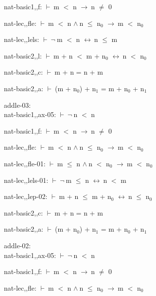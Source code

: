 \documentclass[a4paper]{article}
\newcommand{\Fol}{\mbox{$\vdash\ $}}
\newcommand{\Not}{\mbox{$\neg\ $}}
\newcommand{\And}{\mbox{$\wedge\ $}}
\newcommand{\Imp}{\mbox{$\rightarrow\ $}}
\newcommand{\Equiv}{\mbox{$\leftrightarrow\ $}}
\begin{document}
nat-basic1,,f: 
 \Fol m $<$ n \Imp n $\neq$ 0



nat-lec,,fle: 
 \Fol m $<$ n \And n $\le$ $\mbox{n}_{0}$ \Imp m $<$ $\mbox{n}_{0}$



nat-lec,,lels: 
 \Fol \Not m $<$ n \Equiv n $\le$ m



nat-basic2,,l: 
 \Fol m + n $<$ m + $\mbox{n}_{0}$ \Equiv n $<$ $\mbox{n}_{0}$



nat-basic2,,c: 
 \Fol m + n = n + m



nat-basic2,,a: 
 \Fol (m + $\mbox{n}_{0}$) + $\mbox{n}_{1}$ = m + $\mbox{n}_{0}$ + $\mbox{n}_{1}$



\bigskip

addle-03:\\ nat-basic1,,ax-05: 
 \Fol \Not n $<$ n



nat-basic1,,f: 
 \Fol m $<$ n \Imp n $\neq$ 0



nat-lec,,fle: 
 \Fol m $<$ n \And n $\le$ $\mbox{n}_{0}$ \Imp m $<$ $\mbox{n}_{0}$



nat-lec,,fle-01: 
 \Fol m $\le$ n \And n $<$ $\mbox{n}_{0}$ \Imp m $<$ $\mbox{n}_{0}$



nat-lec,,lels-01: 
 \Fol \Not m $\le$ n \Equiv n $<$ m



nat-lec,,lep-02: 
 \Fol m + n $\le$ m + $\mbox{n}_{0}$ \Equiv n $\le$ $\mbox{n}_{0}$



nat-basic2,,c: 
 \Fol m + n = n + m



nat-basic2,,a: 
 \Fol (m + $\mbox{n}_{0}$) + $\mbox{n}_{1}$ = m + $\mbox{n}_{0}$ + $\mbox{n}_{1}$



\bigskip

addle-02:\\ nat-basic1,,ax-05: 
 \Fol \Not n $<$ n



nat-basic1,,f: 
 \Fol m $<$ n \Imp n $\neq$ 0



nat-lec,,fle: 
 \Fol m $<$ n \And n $\le$ $\mbox{n}_{0}$ \Imp m $<$ $\mbox{n}_{0}$
\end{document}
